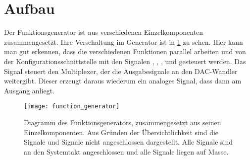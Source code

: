 \section{Aufbau}
Der Funktionsgenerator ist aus verschiedenen Einzelkomponenten zusammengesetzt.
Ihre Verschaltung im Generator ist in \cref{Concept:FuncGenDia} zu sehen.
Hier kann man gut erkennen, dass die verschiedenen Funktionen parallel arbeiten und von der Konfigurationsschnittstelle mit den Signalen , , ,  und  gesteuert werden.
Das Signal  steuert den Multiplexer, der die Ausgabesignale  an den DAC-Wandler weitergibt.
Dieser erzeugt daraus wiederum ein analoges Signal, dass dann am Ausgang anliegt.

\begin{figure}[h]
  \texttt{[image: function\_generator]}
  \caption{Diagramm des Funktionsgenerators, zusammengesetzt aus seinen Einzelkomponenten. Aus Gründen der Übersichtlichkeit sind die  Signale und  Signale nicht angeschlossen dargestellt. Alle  Signale sind an den Systemtakt angeschlossen und alle  Signale liegen auf Masse.}  \label{Concept:FuncGenDia}
\end{figure}

